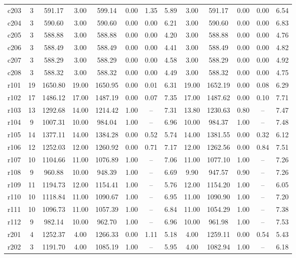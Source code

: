 \begin{longtable}{lcccccccccccc}
c203 & 3 & 591.17 & 3.00 & 599.14 & 0.00 & 1.35 & 5.89 & 3.00 & 591.17 & 0.00 & 0.00 & 6.54 \\
c204 & 3 & 590.60 & 3.00 & 590.60 & 0.00 & 0.00 & 6.21 & 3.00 & 590.60 & 0.00 & 0.00 & 6.83 \\
c205 & 3 & 588.88 & 3.00 & 588.88 & 0.00 & 0.00 & 4.20 & 3.00 & 588.88 & 0.00 & 0.00 & 4.76 \\
c206 & 3 & 588.49 & 3.00 & 588.49 & 0.00 & 0.00 & 4.41 & 3.00 & 588.49 & 0.00 & 0.00 & 4.82 \\
c207 & 3 & 588.29 & 3.00 & 588.29 & 0.00 & 0.00 & 4.58 & 3.00 & 588.29 & 0.00 & 0.00 & 4.92 \\
c208 & 3 & 588.32 & 3.00 & 588.32 & 0.00 & 0.00 & 4.49 & 3.00 & 588.32 & 0.00 & 0.00 & 4.75 \\
r101 & 19 & 1650.80 & 19.00 & 1650.95 & 0.00 & 0.01 & 6.31 & 19.00 & 1652.19 & 0.00 & 0.08 & 6.29 \\
r102 & 17 & 1486.12 & 17.00 & 1487.19 & 0.00 & 0.07 & 7.35 & 17.00 & 1487.62 & 0.00 & 0.10 & 7.71 \\
r103 & 13 & 1292.68 & 14.00 & 1214.42 & 1.00 & -- & 7.31 & 13.80 & 1230.63 & 0.80 & -- & 7.47 \\
r104 & 9 & 1007.31 & 10.00 & 984.04 & 1.00 & -- & 6.96 & 10.00 & 984.37 & 1.00 & -- & 7.48 \\
r105 & 14 & 1377.11 & 14.00 & 1384.28 & 0.00 & 0.52 & 5.74 & 14.00 & 1381.55 & 0.00 & 0.32 & 6.12 \\
r106 & 12 & 1252.03 & 12.00 & 1260.92 & 0.00 & 0.71 & 7.17 & 12.00 & 1262.56 & 0.00 & 0.84 & 7.51 \\
r107 & 10 & 1104.66 & 11.00 & 1076.89 & 1.00 & -- & 7.06 & 11.00 & 1077.10 & 1.00 & -- & 7.26 \\
r108 & 9 & 960.88 & 10.00 & 948.39 & 1.00 & -- & 6.69 & 9.90 & 947.57 & 0.90 & -- & 7.26 \\
r109 & 11 & 1194.73 & 12.00 & 1154.41 & 1.00 & -- & 5.76 & 12.00 & 1154.20 & 1.00 & -- & 6.05 \\
r110 & 10 & 1118.84 & 11.00 & 1090.67 & 1.00 & -- & 6.95 & 11.00 & 1090.90 & 1.00 & -- & 7.20 \\
r111 & 10 & 1096.73 & 11.00 & 1057.39 & 1.00 & -- & 6.84 & 11.00 & 1054.29 & 1.00 & -- & 7.38 \\
r112 & 9 & 982.14 & 10.00 & 962.70 & 1.00 & -- & 6.96 & 10.00 & 961.98 & 1.00 & -- & 7.53 \\
r201 & 4 & 1252.37 & 4.00 & 1266.33 & 0.00 & 1.11 & 5.18 & 4.00 & 1259.11 & 0.00 & 0.54 & 5.43 \\
r202 & 3 & 1191.70 & 4.00 & 1085.19 & 1.00 & -- & 5.95 & 4.00 & 1082.94 & 1.00 & -- & 6.18 \\

\end{longtable}
